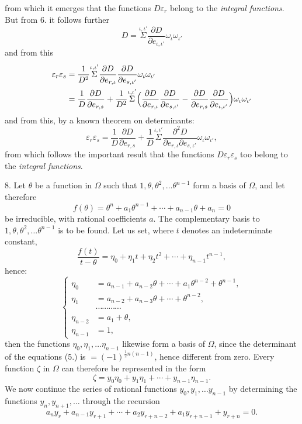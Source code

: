 \documentclass{article}
\begin{document}
from which it emerges that the functions $D\varepsilon_{r}$ belong to the \emph{integral functions}. But from 6. it follows further
\[ D = \overset{\iota,\iota'}{\Sigma}\frac{\partial D}{\partial e_{\iota,\iota'}}\omega_{\iota}\omega_{\iota'} \]
and from this
\[ \begin{aligned} \varepsilon_{r}\varepsilon_{s} &= \frac{1}{D^{2}}\overset{\iota,\iota'}{\Sigma}\frac{\partial D}{\partial e_{r,\iota}}\frac{\partial D}{\partial e_{s,\iota'}}\omega_{\iota}\omega_{\iota'} \\ &= \frac{1}{D}\frac{\partial D}{\partial e_{r,s}} + \frac{1}{D^{2}}\overset{\iota,\iota'}{\Sigma}\Bigl(\frac{\partial D}{\partial e_{r,\iota}}\frac{\partial D}{\partial e_{s,\iota'}} - \frac{\partial D}{\partial e_{r,s}}\frac{\partial D}{\partial e_{\iota,\iota'}}\Bigr)\omega_{\iota}\omega_{\iota'} \end{aligned} \]
and from this, by a known theorem on determinants:
\[ \varepsilon_{r}\varepsilon_{s} = \frac{1}{D}\frac{\partial D}{\partial e_{r,s}} + \frac{1}{D}\overset{\iota,\iota'}{\Sigma}\frac{\partial^{2}D}{\partial e_{r,\iota}\partial e_{s,\iota'}}\omega_{\iota}\omega_{\iota'}, \]
from which follows the important result that the functions $D\varepsilon_{r}\varepsilon_{s}$ too belong to the \emph{integral functions}.

8. Let $\theta$ be a function in $\Omega$ such that $1, \theta, \theta^{2}, \ldots \theta^{n-1}$ form a basis of $\Omega$, and let therefore
\[ f(\theta) = \theta^{n} + a_{1}\theta^{n-1} + \cdots + a_{n-1}\theta + a_{n} = 0 \tag{4.} \]
be irreducible, with rational coefficients $a$. The complementary basis to $1, \theta, \theta^{2}, \ldots \theta^{n-1}$ is to be found. Let us set, where $t$ denotes an indeterminate constant,
\[ \frac{f(t)}{t-\theta} = \eta_{0} + \eta_{1}t + \eta_{2}t^{2} + \cdots + \eta_{n-1}t^{n-1}, \]
hence:
\[ \left\{ \begin{aligned} \eta_{0} &= a_{n-1} + a_{n-2}\theta + \cdots + a_{1}\theta^{n-2} + \theta^{n-1}, \\ \eta_{1} &= a_{n-2} + a_{n-3}\theta + \cdots + \theta^{n-2}, \\ &\cdots\cdots\cdots\cdots \\ \eta_{n-2} &= a_{1} + \theta, \\ \eta_{n-1} &= 1, \end{aligned} \right. \tag{5.} \]
then the functions $\eta_{0}, \eta_{1}, \ldots \eta_{n-1}$ likewise form a basis of $\Omega$, since the determinant of the equations (5.) is $= (-1)^{\frac{1}{2}n(n-1)}$, hence different from zero. Every function $\zeta$ in $\Omega$ can therefore be represented in the form
\[ \zeta = y_{0}\eta_{0} + y_{1}\eta_{1} + \cdots + y_{n-1}\eta_{n-1}. \]
We now continue the series of rational functions $y_{0}, y_{1}, \ldots y_{n-1}$ by determining the functions $y_{n}, y_{n+1}, \ldots$ through the recursion
\[ a_{n}y_{r} + a_{n-1}y_{r+1} + \cdots + a_{2}y_{r+n-2} + a_{1}y_{r+n-1} + y_{r+n} = 0. \tag{6.} \]
\end{document}

